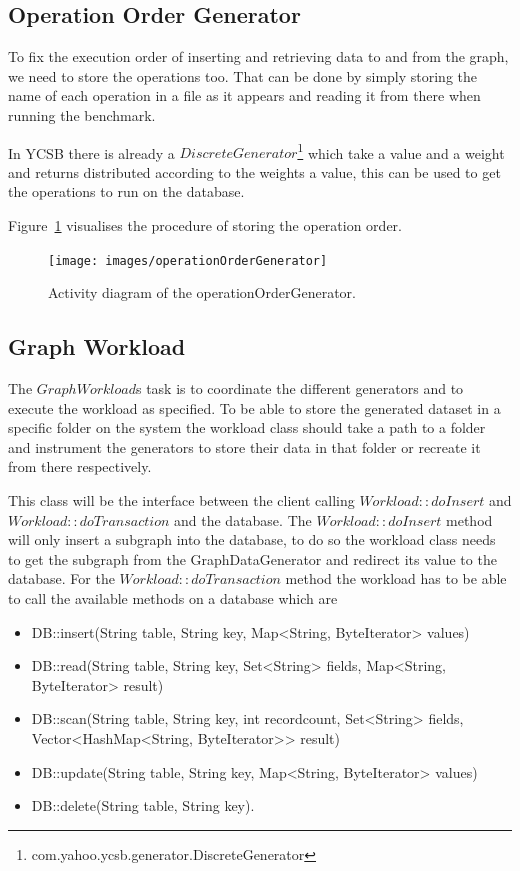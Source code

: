 \subsection{Operation Order Generator}
\label{ch:design:se:operationOrderGenerator}
To fix the execution order of inserting and retrieving data to and from the graph,
we need to store the operations too.
That can be done by simply storing the name of each operation in a file as it appears and reading it from there when running the benchmark.

In YCSB there is already a $ DiscreteGenerator $\footnote{com.yahoo.ycsb.generator.DiscreteGenerator} which take a value and a weight and returns distributed according to the weights a value,
this can be used to get the operations to run on the database.

Figure~\ref{fig:operationOrderGenerator} visualises the procedure of storing the operation order.

\begin{figure}
  \texttt{[image: images/operationOrderGenerator]}
  \caption{Activity diagram of the operationOrderGenerator.\todo{}}
  \label{fig:operationOrderGenerator}
\end{figure}

\subsection{Graph Workload}
The $ GraphWorkload $s task is to coordinate the different generators and to execute the workload as specified.
To be able to store the generated dataset in a specific folder on the system the workload class should take a path to a folder and instrument the generators to store their data in that folder or recreate it from there respectively.

This class will be the interface between the client calling $ Workload::doInsert $ and $ Workload::doTransaction $ and the database.
The $ Workload::doInsert $ method will only insert a subgraph into the database,
to do so the workload class needs to get the subgraph from the GraphDataGenerator and redirect its value to the database.
For the $ Workload::doTransaction $ method the workload has to be able to call the available methods on a database which are

\begin{itemize}
  \item DB::insert(String table, String key, Map<String, ByteIterator> values)
  \item DB::read(String table, String key, Set<String> fields, Map<String, ByteIterator> result)
  \item DB::scan(String table, String key, int recordcount, Set<String> fields, Vector<HashMap<String, ByteIterator>{}> result)
  \item DB::update(String table, String key, Map<String, ByteIterator> values)
  \item DB::delete(String table, String key).
\end{itemize}

